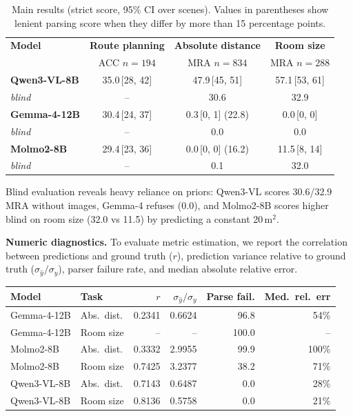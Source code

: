 \documentclass{article}
\begin{document}
\vspace{2pt}
\begin{table}[h]
\centering
\caption{Main results (strict score, 95\% CI over scenes). Values in parentheses show lenient parsing score
 when they differ by more than 15 percentage points.}
\label{tab:results}
\small
\begin{tabular}{@{}lccc@{}}
\toprule
\textbf{Model} & \textbf{Route planning} & \textbf{Absolute distance} & \textbf{Room size} \\
 & \footnotesize ACC $n{=}194$ & \footnotesize MRA $n{=}834$ & \footnotesize MRA $n{=}288$ \\
\midrule
\textbf{Qwen3-VL-8B} & 35.0\,[28, 42] & 47.9\,[45, 51] & 57.1\,[53, 61] \\
\quad\emph{blind} & -- & 30.6 & 32.9 \\[1pt]
\textbf{Gemma-4-12B} & 30.4\,[24, 37] & 0.3\,[0, 1] (22.8) & 0.0\,[0, 0] \\
\quad\emph{blind} & -- & 0.0 & 0.0 \\[1pt]
\textbf{Molmo2-8B} & 29.4\,[23, 36] & 0.0\,[0, 0] (16.2) & 11.5\,[8, 14] \\
\quad\emph{blind} & -- & 0.1 & 32.0 \\[1pt]
\bottomrule
\end{tabular}
\end{table}

Blind evaluation reveals heavy reliance on priors: Qwen3-VL scores 30.6/32.9 MRA without images,
Gemma-4 refuses (0.0), and Molmo2-8B scores higher blind on room size (32.0 vs 11.5) by predicting
a constant 20\,m$^2$.

\vspace{2pt}
\noindent\textbf{Numeric diagnostics.} To evaluate metric estimation, we report the correlation between
predictions and ground truth ($r$), prediction variance relative to ground truth ($\sigma_{\hat{y}}/\sigma_y$),
parser failure rate, and median absolute relative error.

\vspace{2pt}
\begin{center}\begin{tabular}{@{}llrrrr@{}}
\toprule
Model & Task & $r$ & $\sigma_{\hat{y}}/\sigma_y$ & Parse fail. & Med.\ rel.\ err \\
\midrule
Gemma-4-12B & Abs.\ dist. & 0.2341 & 0.6624 & 96.8 & 54\% \\
Gemma-4-12B & Room size & -- & -- & 100.0 & -- \\
Molmo2-8B & Abs.\ dist. & 0.3332 & 2.9955 & 99.9 & 100\% \\
Molmo2-8B & Room size & 0.7425 & 3.2377 & 38.2 & 71\% \\
Qwen3-VL-8B & Abs.\ dist. & 0.7143 & 0.6487 & 0.0 & 28\% \\
Qwen3-VL-8B & Room size & 0.8136 & 0.5758 & 0.0 & 21\% \\
\bottomrule
\end{tabular}\end{center}
\end{document}
